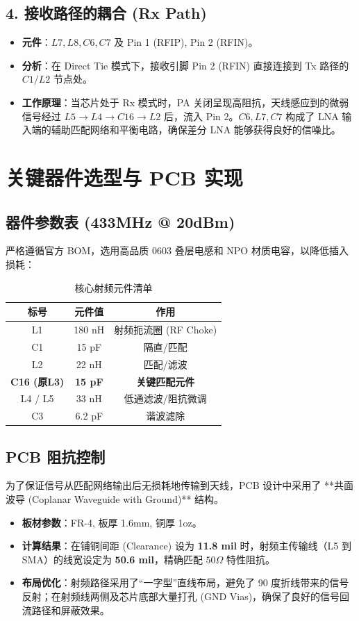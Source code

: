 \documentclass[a4paper,12pt]{article}
\begin{document}
	\subsection{4. 接收路径的耦合 (Rx Path)}
	\begin{itemize}
		\item \textbf{元件}：$L7, L8, C6, C7$ 及 Pin 1 (RFIP), Pin 2 (RFIN)。
		\item \textbf{分析}：在 Direct Tie 模式下，接收引脚 Pin 2 (RFIN) 直接连接到 Tx 路径的 $C1/L2$ 节点处。
		\item \textbf{工作原理}：当芯片处于 Rx 模式时，PA 关闭呈现高阻抗，天线感应到的微弱信号经过 $L5 \to L4 \to C16 \to L2$ 后，流入 Pin 2。$C6, L7, C7$ 构成了 LNA 输入端的辅助匹配网络和平衡电路，确保差分 LNA 能够获得良好的信噪比。
	\end{itemize}

	\section{关键器件选型与 PCB 实现}

	\subsection{器件参数表 (433MHz @ 20dBm)}
	严格遵循官方 BOM，选用高品质 0603 叠层电感和 NPO 材质电容，以降低插入损耗：
	\begin{table}[H]
		\centering
		\begin{tabular}{ccc}
			\toprule
			\textbf{标号} & \textbf{元件值} & \textbf{作用} \\
			\midrule
			L1 & 180 nH & 射频扼流圈 (RF Choke) \\
			C1 & 15 pF & 隔直/匹配 \\
			L2 & 22 nH & 匹配/滤波 \\
			\textbf{C16 (原L3)} & \textbf{15 pF} & \textbf{关键匹配元件} \\
			L4 / L5 & 33 nH & 低通滤波/阻抗微调 \\
			C3 & 6.2 pF & 谐波滤除 \\
			\bottomrule
		\end{tabular}
		\caption{核心射频元件清单}
	\end{table}

	\subsection{PCB 阻抗控制}
	为了保证信号从匹配网络输出后无损耗地传输到天线，PCB 设计中采用了 **共面波导 (Coplanar Waveguide with Ground)** 结构。
	\begin{itemize}
		\item \textbf{板材参数}：FR-4, 板厚 1.6mm, 铜厚 1oz。
		\item \textbf{计算结果}：在铺铜间距 (Clearance) 设为 \textbf{11.8 mil} 时，射频主传输线（L5 到 SMA）的线宽设定为 \textbf{50.6 mil}，精确匹配 $50\Omega$ 特性阻抗。
		\item \textbf{布局优化}：射频路径采用了“一字型”直线布局，避免了 90 度折线带来的信号反射；在射频线两侧及芯片底部大量打孔 (GND Vias)，确保了良好的信号回流路径和屏蔽效果。
	\end{itemize}
\end{document}
